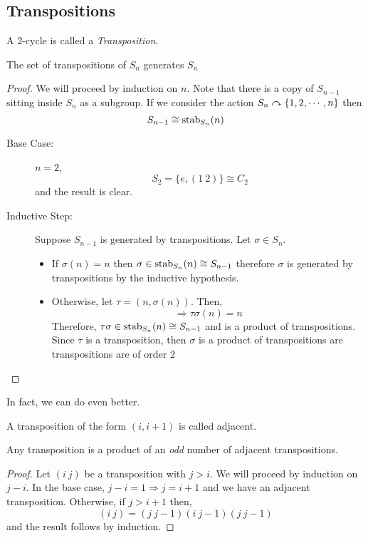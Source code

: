 \documentclass{article}
\begin{document}
\subsection{Transpositions}
\begin{defi}[Transposition]
    A $2$-cycle is called a \emph{Transposition}.
\end{defi}

\begin{thm}
    The set of transpositions of $S_n$ generates $S_n$
\end{thm}
\begin{proof}
    We will proceed by induction on $n$. Note that there is a copy of $S_{n-1}$ sitting inside $S_n$ as a subgroup. If we consider the action $S_n \curvearrowright \{1, 2, \cdots, n\}$ then
    \[
        S_{n-1} \cong \operatorname{stab}_{S_n}(n)  
    \]
    \begin{description}
        \item[Base Case: ] $n = 2$,
        \[
            S_2 = \{e, (1\ 2)\} \cong C_2  
        \]
        and the result is clear.
        \item[Inductive Step: ] Suppose $S_{n-1}$ is generated by transpositions. Let $\sigma \in S_n$.
        \begin{itemize}
            \item If $\sigma(n) = n$ then $\sigma \in \operatorname{stab}_{S_n}(n) \cong S_{n-1}$ therefore $\sigma$ is generated by transpositions by the inductive hypothesis.
            \item Otherwise, let $\tau = (n, \sigma(n))$. Then,
            \[
                \Rightarrow \tau\sigma(n) = n   
            \]
            Therefore, $\tau\sigma \in \operatorname{stab}_{S_n}(n) \cong S_{n-1}$ and is a product of transpositions. Since $\tau$ is a transposition, then $\sigma$ is a product of transpositions are transpositions are of order $2$
        \end{itemize}
    \end{description}
\end{proof}

In fact, we can do even better.
\begin{defi}
    A transposition of the form $(i, i+1)$ is called adjacent.
\end{defi}

\begin{lemma}
    Any transposition is a product of an \emph{odd} number of adjacent transpositions.
\end{lemma}
\begin{proof}
    Let $(i\ j)$ be a transposition with $j > i$. We will proceed by induction on $j - i$. 
    In the base case, $j - i = 1 \Rightarrow j = i + 1$ and we have an adjacent transposition.
    Otherwise, if $j > i + 1$ then,
    \[
        (i\ j) = (j\ j-1)(i\ j-1)(j\ j-1)  
    \]
    and the result follows by induction.
\end{proof}
\end{document}
